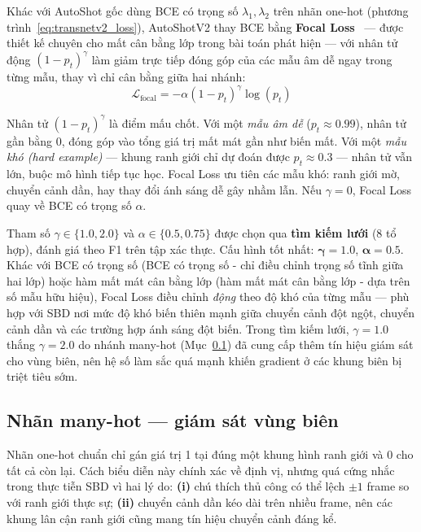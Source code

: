 Khác với AutoShot gốc dùng BCE có trọng số $\lambda_1, \lambda_2$ trên nhãn one-hot (phương trình~\eqref{eq:transnetv2_loss}), AutoShotV2 thay BCE bằng \textbf{Focal Loss}~\cite{Lin2017FocalLoss} --- được thiết kế chuyên cho mất cân bằng lớp trong bài toán phát hiện --- với nhân tử động $(1-p_t)^{\gamma}$ làm giảm trực tiếp đóng góp của các mẫu âm dễ ngay trong từng mẫu, thay vì chỉ cân bằng giữa hai nhánh:
\begin{equation}
    \mathcal{L}_{\text{focal}} = -\alpha(1-p_t)^{\gamma}\log(p_t)
    \label{eq:focal_loss}
\end{equation}

Nhân tử $(1-p_t)^{\gamma}$ là điểm mấu chốt. Với một \textit{mẫu âm dễ} ($p_t \approx 0.99$), nhân tử gần bằng 0, đóng góp vào tổng giá trị mất mát gần như biến mất. Với một \textit{mẫu khó (hard example)} --- khung ranh giới chỉ dự đoán được $p_t \approx 0.3$ --- nhân tử vẫn lớn, buộc mô hình tiếp tục học. Focal Loss ưu tiên các mẫu khó: ranh giới mờ, chuyển cảnh dần, hay thay đổi ánh sáng dễ gây nhầm lẫn. Nếu $\gamma = 0$, Focal Loss quay về BCE có trọng số $\alpha$.

Tham số $\gamma \in \{1.0, 2.0\}$ và $\alpha \in \{0.5, 0.75\}$ được chọn qua \textbf{tìm kiếm lưới} (8 tổ hợp), đánh giá theo F1 trên tập xác thực. Cấu hình tốt nhất: $\boldsymbol{\gamma = 1.0}$, $\boldsymbol{\alpha = 0.5}$. Khác với BCE có trọng số (BCE có trọng số - chỉ điều chỉnh trọng số tĩnh giữa hai lớp) hoặc hàm mất mát cân bằng lớp (hàm mất mát cân bằng lớp - dựa trên số mẫu hữu hiệu), Focal Loss điều chỉnh \textit{động} theo độ khó của từng mẫu --- phù hợp với SBD nơi mức độ khó biến thiên mạnh giữa chuyển cảnh đột ngột, chuyển cảnh dần và các trường hợp ánh sáng đột biến. Trong tìm kiếm lưới, $\gamma=1.0$ thắng $\gamma=2.0$ do nhánh many-hot (Mục~\ref{subsec:v2_manyhot}) đã cung cấp thêm tín hiệu giám sát cho vùng biên, nên hệ số làm sắc quá mạnh khiến gradient ở các khung biên bị triệt tiêu sớm.

\subsection{Nhãn many-hot --- giám sát vùng biên}
\label{subsec:v2_manyhot}

Nhãn one-hot chuẩn chỉ gán giá trị 1 tại đúng một khung hình ranh giới và 0 cho tất cả còn lại. Cách biểu diễn này chính xác về định vị, nhưng quá cứng nhắc trong thực tiễn SBD vì hai lý do: \textbf{(i)} chú thích thủ công có thể lệch $\pm1$ frame so với ranh giới thực sự; \textbf{(ii)} chuyển cảnh dần kéo dài trên nhiều frame, nên các khung lân cận ranh giới cũng mang tín hiệu chuyển cảnh đáng kể.

